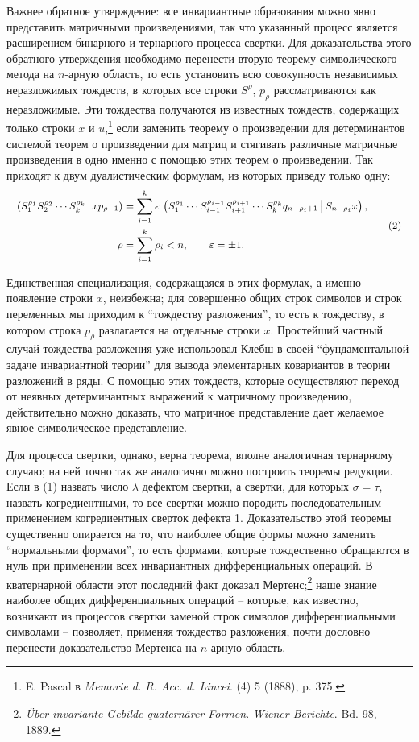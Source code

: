 \documentclass[11pt]{article}
\newcommand{\eps}{\varepsilon}
\newcommand{\pair}[2]{\left(#1\,\middle|\,#2\right)}
\begin{document}
Важнее обратное утверждение: все инвариантные образования можно явно представить матричными произведениями, так что указанный процесс является расширением бинарного и тернарного процесса свертки. Для доказательства этого обратного утверждения необходимо перенести вторую теорему символического метода на $n$-арную область, то есть установить всю совокупность независимых неразложимых тождеств, в которых все строки $S^\rho$, $p_\rho$ рассматриваются как неразложимые. Эти тождества получаются из известных тождеств, содержащих только строки $x$ и $u$,\footnote{E. Pascal в \emph{Memorie d. R. Acc. d. Lincei}. (4) 5 (1888), p. 375.} если заменить теорему о произведении для детерминантов системой теорем о произведении для матриц и стягивать различные матричные произведения в одно именно с помощью этих теорем о произведении. Так приходят к двум дуалистическим формулам, из которых приведу только одну:
\begin{equation}
\small
\begin{aligned}
 \pair{S_1^{\rho_1}S_2^{\rho_2}\cdots S_k^{\rho_k}}{x p_{\rho-1}}
 &=\sum_{i=1}^{k}\eps\,\pair{S_1^{\rho_1}\cdots S_{i-1}^{\rho_{i-1}}S_{i+1}^{\rho_{i+1}}\cdots S_k^{\rho_k}q_{n-\rho_i+1}}{S_{n-\rho_i}x},\\
 \rho&=\sum_{i=1}^{k}\rho_i<n,\qquad \eps=\pm1.
\end{aligned}
\tag{2}
\end{equation}

Единственная специализация, содержащаяся в этих формулах, а именно появление строки $x$, неизбежна; для совершенно общих строк символов и строк переменных мы приходим к ``тождеству разложения'', то есть к тождеству, в котором строка $p_\rho$ разлагается на отдельные строки $x$. Простейший частный случай тождества разложения уже использовал Клебш в своей ``фундаментальной задаче инвариантной теории'' для вывода элементарных ковариантов в теории разложений в ряды. С помощью этих тождеств, которые осуществляют переход от неявных детерминантных выражений к матричному произведению, действительно можно доказать, что матричное представление дает желаемое явное символическое представление.

Для процесса свертки, однако, верна теорема, вполне аналогичная тернарному случаю; на ней точно так же аналогично можно построить теоремы редукции. Если в (1) назвать число $\lambda$ дефектом свертки, а свертки, для которых $\sigma=\tau$, назвать когредиентными, то все свертки можно породить последовательным применением когредиентных сверток дефекта 1. Доказательство этой теоремы существенно опирается на то, что наиболее общие формы можно заменить ``нормальными формами'', то есть формами, которые тождественно обращаются в нуль при применении всех инвариантных дифференциальных операций. В кватернарной области этот последний факт доказал Мертенс;\footnote{\emph{Über invariante Gebilde quaternärer Formen}. \emph{Wiener Berichte}. Bd. 98, 1889.} наше знание наиболее общих дифференциальных операций -- которые, как известно, возникают из процессов свертки заменой строк символов дифференциальными символами -- позволяет, применяя тождество разложения, почти дословно перенести доказательство Мертенса на $n$-арную область.
\end{document}
